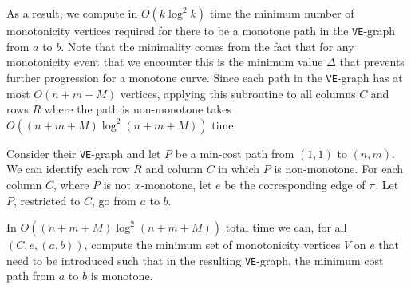 \documentclass[english, thm-restate, notab]{lipics-v2021}
\begin{document}
As a result, we compute in $O(k \log^2 k)$ time the minimum number of monotonicity vertices required for there to be a monotone path in the \texttt{VE}-graph from $a$ to $b$. Note that the minimality comes from the fact that for any monotonicity event that we encounter this is the minimum value $\Delta$ that prevents further progression for a monotone curve. 
Since each path in the \texttt{VE}-graph has at most $O(n + m + M)$ vertices, applying this subroutine to all columns $C$ and rows $R$ where the path is non-monotone takes $O( (n + m + M) \log^2 (n + m + M))$ time:

\begin{lemma}
    Consider their \texttt{VE}-graph and let $P$ be a min-cost path from $(1, 1)$ to $(n, m)$. 
We can identify each row $R$ and column $C$ in which $P$ is non-monotone.
For each column $C$, where $P$ is not $x$-monotone, let $e$ be the corresponding edge of $\pi$. Let $P$, restricted to $C$, go from $a$ to $b$.

In $O( (n + m + M) \log^2 (n + m + M))$ total time we can, for all $(C, e, (a, b))$,  compute the minimum set of monotonicity vertices $V$ on $e$ that need to be introduced such that in the resulting \texttt{VE}-graph, the minimum cost path from $a$ to $b$ is monotone. 
\end{lemma}
\end{document}
